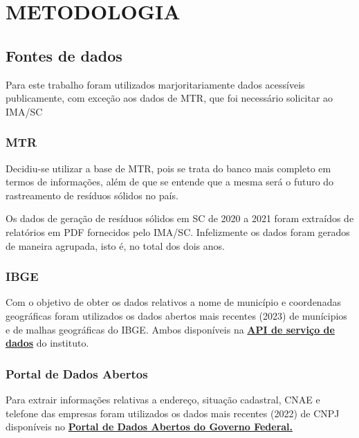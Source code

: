 \chapter{METODOLOGIA}

\section{Fontes de dados}

Para este trabalho foram utilizados marjoritariamente dados acessíveis publicamente, com exceção aos dados de \gls{MTR}, que foi necessário solicitar ao \gls{IMA/SC}

\subsection{MTR}

Decidiu-se utilizar a base de MTR, pois se trata do banco mais completo em termos de informações, além de que se entende que a mesma será o futuro do rastreamento de resíduos sólidos no país.

Os dados de geração de resíduos sólidos em \gls{SC} de 2020 a 2021 foram extraídos de relatórios em \gls{PDF} fornecidos pelo \gls{IMA/SC}. Infelizmente os dados foram gerados de maneira agrupada, isto é, no total dos dois anos.

\subsection{IBGE}

Com o objetivo de obter os dados relativos a nome de município e coordenadas geográficas foram utilizados os dados abertos mais recentes (2023) de munícipios e de malhas geográficas do \gls{IBGE}. Ambos disponíveis na \href{https://servicodados.ibge.gov.br/api/docs/}{\textbf{\gls{API} de serviço de dados}} do instituto.

\subsection{Portal de Dados Abertos}

Para extrair informações relativas a endereço, situação cadastral, \gls{CNAE} e telefone das empresas foram utilizados os dados mais recentes (2022) de \gls{CNPJ} disponíveis no \href{https://dados.gov.br/dados/conjuntos-dados/cadastro-nacional-da-pessoa-juridica---cnpj}{\textbf{Portal de Dados Abertos do Governo Federal.}}


